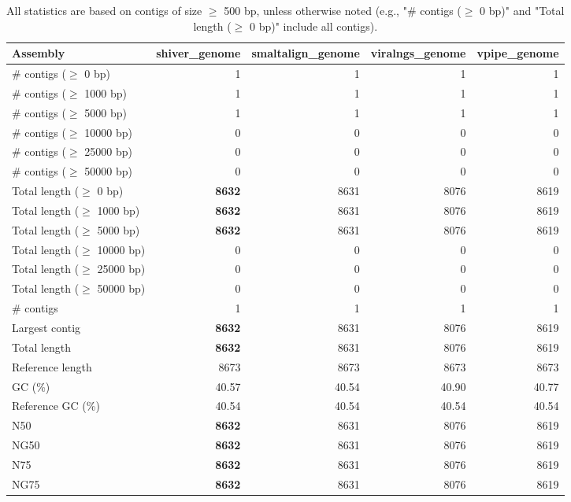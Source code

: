\documentclass[12pt,a4paper]{article}
\begin{document}
\begin{table}[ht]
\begin{center}
\caption{All statistics are based on contigs of size $\geq$ 500 bp, unless otherwise noted (e.g., "\# contigs ($\geq$ 0 bp)" and "Total length ($\geq$ 0 bp)" include all contigs).}
\begin{tabular}{|l*{4}{|r}|}
\hline
Assembly & shiver\_genome & smaltalign\_genome & viralngs\_genome & vpipe\_genome \\ \hline
\# contigs ($\geq$ 0 bp) & 1 & 1 & 1 & 1 \\ \hline
\# contigs ($\geq$ 1000 bp) & 1 & 1 & 1 & 1 \\ \hline
\# contigs ($\geq$ 5000 bp) & 1 & 1 & 1 & 1 \\ \hline
\# contigs ($\geq$ 10000 bp) & 0 & 0 & 0 & 0 \\ \hline
\# contigs ($\geq$ 25000 bp) & 0 & 0 & 0 & 0 \\ \hline
\# contigs ($\geq$ 50000 bp) & 0 & 0 & 0 & 0 \\ \hline
Total length ($\geq$ 0 bp) & {\bf 8632} & 8631 & 8076 & 8619 \\ \hline
Total length ($\geq$ 1000 bp) & {\bf 8632} & 8631 & 8076 & 8619 \\ \hline
Total length ($\geq$ 5000 bp) & {\bf 8632} & 8631 & 8076 & 8619 \\ \hline
Total length ($\geq$ 10000 bp) & 0 & 0 & 0 & 0 \\ \hline
Total length ($\geq$ 25000 bp) & 0 & 0 & 0 & 0 \\ \hline
Total length ($\geq$ 50000 bp) & 0 & 0 & 0 & 0 \\ \hline
\# contigs & 1 & 1 & 1 & 1 \\ \hline
Largest contig & {\bf 8632} & 8631 & 8076 & 8619 \\ \hline
Total length & {\bf 8632} & 8631 & 8076 & 8619 \\ \hline
Reference length & 8673 & 8673 & 8673 & 8673 \\ \hline
GC (\%) & 40.57 & 40.54 & 40.90 & 40.77 \\ \hline
Reference GC (\%) & 40.54 & 40.54 & 40.54 & 40.54 \\ \hline
N50 & {\bf 8632} & 8631 & 8076 & 8619 \\ \hline
NG50 & {\bf 8632} & 8631 & 8076 & 8619 \\ \hline
N75 & {\bf 8632} & 8631 & 8076 & 8619 \\ \hline
NG75 & {\bf 8632} & 8631 & 8076 & 8619 \\ \hline

\end{tabular}
\end{center}
\end{table}
\end{document}

